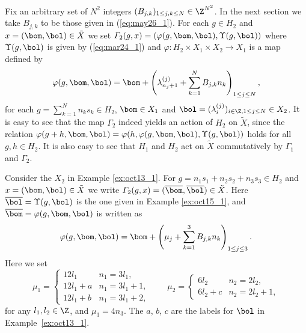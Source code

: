 Fix an arbitrary set of $N^2$ integers $(B_{j,k})_{1 \leq j,k \leq N} \in \Z^{N^2}$.
In the next section we take $B_{j,k}$ to be those given in (\ref{eq:may26_1}).
For each $g \in H_2$ and $x =(\bom,\bol) \in \tilde{X}$
we set
$\varGamma_2(g, x) = (\varphi (g, \bom, \bol), \Upsilon (g,\bol))$ where
{$\Upsilon (g,\bol)$ is given by (\ref{eq:mar24_1}) and
$\varphi : H_2 \times X_1 \times X_2 \rightarrow X_1$ is a map def\/ined by
\begin{equation}\label{eq:oct19_2}
\varphi (g, \bom, \bol) = \bom +
\left(  \lambda^{(j)}_{n_j+1} + \sum_{k=1}^N B_{j,k} n_k \right)_{1 \leq j \leq N},
\end{equation}
for each $g = \sum_{k=1}^N n_k s_k \in H_2$,
$\bom \in X_1$ and
$\bol = (\lambda^{(j)}_i)_{i \in \Z, 1 \leq j \leq N} \in X_2$.}
It is easy to see that
the map $\varGamma_2$ indeed yields an action of $H_2$ on $\tilde{X}$, since
the relation $\varphi (g + h, \bom, \bol) =
\varphi (h, \varphi(g, \bom, \bol) , \Upsilon (g,\bol))$ holds for all $g,h \in H_2$.
It is also easy to see that
$H_1$ and $H_2$ act on $\tilde{X}$ commutatively by $\varGamma_1$ and $\varGamma_2$.
%
\begin{example}\label{ex:oct15_3}
Consider the $X_2$ in Example \ref{ex:oct13_1}.
%
For $g = n_1 s_1 + n_2 s_2 + n_3 s_3 \in H_2$ and
$x =(\bom,\bol) \in \tilde{X}$
we write $\varGamma_2(g, x) =(\overline{\bom}, \overline{\bol}) \in \tilde{X}$.
Here $\overline{\bol} = \Upsilon (g , \bol)$ is the one given in Example \ref{ex:oct15_1}, and
$\overline{\bom} = \varphi (g, \bom, \bol)$ is written as
\begin{displaymath}
\varphi (g, \bom, \bol) = \bom +
\left( \mu_j + \sum_{k=1}^3 B_{j,k} n_k \right) _{1 \leq j \leq 3}.
\end{displaymath}
Here we set
\begin{equation*}
\mu_1 =
\begin{cases}
12 l_1 & n_1 = 3 l_1,\\
12 l_1 + a & n_1 = 3 l_1+1,\\
12 l_1 + b & n_1 = 3 l_1+2,
\end{cases}
\qquad
\mu_2 =
\begin{cases}
6 l_2 & n_2 = 2 l_2,\\
6 l_2 + c & n_2 = 2 l_2 + 1,
\end{cases}
\end{equation*}
for any $l_1, l_2 \in \Z$, and $\mu_3 = 4 n_3$.
The $a$, $b$, $c$ are the labels for $\bol$ in Example~\ref{ex:oct13_1}.
\end{example}





